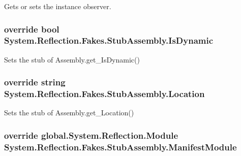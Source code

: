 Gets or sets the instance observer.

\hypertarget{class_system_1_1_reflection_1_1_fakes_1_1_stub_assembly_a3fda9dd49ce42b7fdbda870312a90be0}{
\subsubsection[{Is\-Dynamic}]{\setlength{\rightskip}{0pt plus 5cm}override bool System.\-Reflection.\-Fakes.\-Stub\-Assembly.\-Is\-Dynamic\hspace{0.3cm}{\ttfamily [get]}}}\label{class_system_1_1_reflection_1_1_fakes_1_1_stub_assembly_a3fda9dd49ce42b7fdbda870312a90be0}


Sets the stub of Assembly.\-get\-\_\-\-Is\-Dynamic()

\hypertarget{class_system_1_1_reflection_1_1_fakes_1_1_stub_assembly_acfa4d04b127b31a571cc1479089c5dc9}{
\subsubsection[{Location}]{\setlength{\rightskip}{0pt plus 5cm}override string System.\-Reflection.\-Fakes.\-Stub\-Assembly.\-Location\hspace{0.3cm}{\ttfamily [get]}}}\label{class_system_1_1_reflection_1_1_fakes_1_1_stub_assembly_acfa4d04b127b31a571cc1479089c5dc9}


Sets the stub of Assembly.\-get\-\_\-\-Location()

\hypertarget{class_system_1_1_reflection_1_1_fakes_1_1_stub_assembly_a1af1fd7dc170b583cb09098fd08f0e7e}{
\subsubsection[{Manifest\-Module}]{\setlength{\rightskip}{0pt plus 5cm}override global.\-System.\-Reflection.\-Module System.\-Reflection.\-Fakes.\-Stub\-Assembly.\-Manifest\-Module\hspace{0.3cm}{\ttfamily [get]}}}\label{class_system_1_1_reflection_1_1_fakes_1_1_stub_assembly_a1af1fd7dc170b583cb09098fd08f0e7e}


